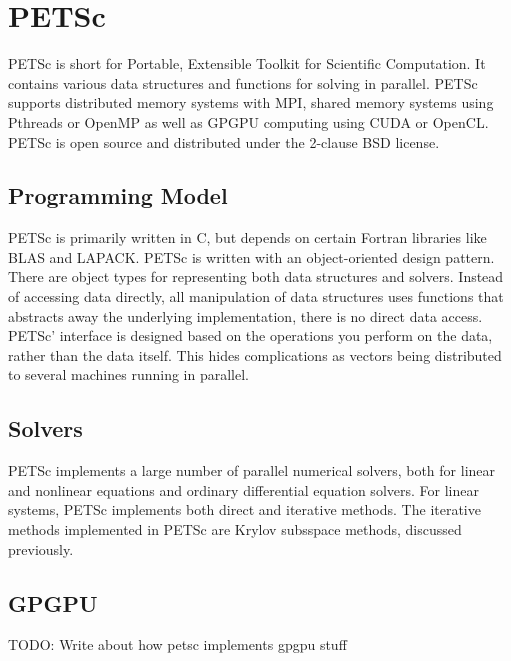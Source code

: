 \section{PETSc}

PETSc is short for Portable, Extensible Toolkit for Scientific Computation. 
It contains various data structures and functions for 
solving  in parallel. PETSc supports distributed 
memory systems with MPI, shared memory systems using Pthreads or OpenMP as well 
as GPGPU computing using CUDA or OpenCL. PETSc is open source and distributed 
under the 2-clause BSD license\cite{petsc-web-page}.

\subsection{Programming Model}
PETSc is primarily written in C, but depends on certain Fortran libraries like BLAS 
and LAPACK. PETSc is written with an object-oriented design pattern.
There are object types for representing both data structures and solvers.
Instead of accessing data directly, all manipulation of data structures uses functions
that abstracts away the underlying implementation, there is no direct data access. 
PETSc' interface is designed based on the operations you perform on the data, rather 
than the data itself. This hides complications as vectors being distributed to 
several machines running in parallel.

\subsection{Solvers}
PETSc implements a large number of parallel numerical solvers, both for linear and 
nonlinear equations and ordinary differential equation solvers. For linear systems, 
PETSc implements both direct and iterative methods. The iterative methods implemented 
in PETSc are Krylov subsspace methods, discussed previously.

\subsection{GPGPU}

TODO: Write about how petsc implements gpgpu stuff

